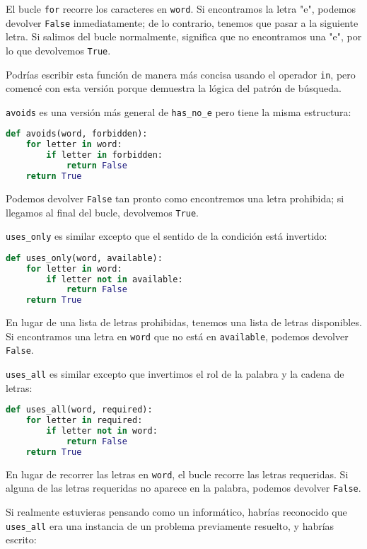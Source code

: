 El bucle \texttt{for} recorre los caracteres en \texttt{word}. Si encontramos la letra "e", podemos devolver \texttt{False} inmediatamente; de lo contrario, tenemos que pasar a la siguiente letra. Si salimos del bucle normalmente, significa que no encontramos una "e", por lo que devolvemos \texttt{True}.

Podrías escribir esta función de manera más concisa usando el operador \texttt{in}, pero comencé con esta versión porque demuestra la lógica del patrón de búsqueda.

\texttt{avoids} es una versión más general de \texttt{has\_no\_e} pero tiene la misma estructura:

\begin{lstlisting}[language=Python]
def avoids(word, forbidden):
    for letter in word:
        if letter in forbidden:
            return False
    return True
\end{lstlisting}

Podemos devolver \texttt{False} tan pronto como encontremos una letra prohibida; si llegamos al final del bucle, devolvemos \texttt{True}.

\texttt{uses\_only} es similar excepto que el sentido de la condición está invertido:

\begin{lstlisting}[language=Python]
def uses_only(word, available):
    for letter in word:
        if letter not in available:
            return False
    return True
\end{lstlisting}

En lugar de una lista de letras prohibidas, tenemos una lista de letras disponibles. Si encontramos una letra en \texttt{word} que no está en \texttt{available}, podemos devolver \texttt{False}.

\texttt{uses\_all} es similar excepto que invertimos el rol de la palabra y la cadena de letras:

\begin{lstlisting}[language=Python]
def uses_all(word, required):
    for letter in required:
        if letter not in word:
            return False
    return True
\end{lstlisting}

En lugar de recorrer las letras en \texttt{word}, el bucle recorre las letras requeridas. Si alguna de las letras requeridas no aparece en la palabra, podemos devolver \texttt{False}.

Si realmente estuvieras pensando como un informático, habrías reconocido que \texttt{uses\_all} era una instancia de un problema previamente resuelto, y habrías escrito:

